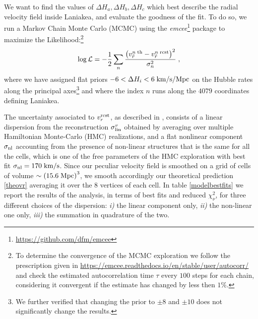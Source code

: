 \documentclass[notitlepage,nofootinbib]{revtex4-1}
\begin{document}
We want to find the values of $\Delta H_a,\Delta H_b,\Delta H_c$ which best describe the radial velocity field inside Laniakea, and evaluate the goodness of the fit. To do so, we run a Markov Chain Monte Carlo (MCMC) using the \textit{emcee}\footnote{\href{https://github.com/dfm/emcee}{https://github.com/dfm/emcee}} package \cite{2013PASP..125..306F} to maximize the Likelihood:\footnote{To determine the convergence of the MCMC exploration we follow the prescription given in \href{https://emcee.readthedocs.io/en/stable/user/autocorr/}{https://emcee.readthedocs.io/en/stable/user/autocorr/} and check the estimated autocorrelation time $\tau$ every $100$ steps for each chain, considering it convergent if the estimate has changed by less then $1\%$.}
\begin{equation}
\log{\mathcal{L}}=-\frac{1}{2}\sum_n\frac{\left(v^{n\;\rm{th}}_{\tilde{r}} -v^{n\;\rm{rcst}}_{\tilde{r}}\right)^2}{\sigma^2_n}\;,
\end{equation} 
where we have assigned flat priors $-6 < \Delta H_i < 6 \; \rm{km}/\rm{s}/\rm{Mpc}$  on the Hubble rates along the principal axes\footnote{We further verified that changing the prior to $\pm 8$ and $\pm 10$ does not significantly change the results.} and where the index $n$ runs along the $4079$ coordinates defining Laniakea.


The uncertainty associated to $v_r^{\rm{rcst}}$, as described in \cite{Dupuy:2023ffz}, consists of a linear dispersion from the reconstruction $\sigma^{v}_{\rm lin}$ obtained by averaging over multiple Hamiltonian Monte-Carlo (HMC) realizations, and a flat nonlinear component $\sigma_{\rm{nl}}$ accounting from the presence of non-linear structures that is the same for all the cells, which is one of the free parameters of the HMC exploration with best fit $\sigma_{\rm{nl}}=170\; \rm{km/s}$. Since our peculiar velocity field is smoothed on a grid of cells of volume $\sim \left(15.6 \;\rm{Mpc}\right)^3$, we smooth accordingly our theoretical prediction \eqref{theovr} averaging it over the 8 vertices of each cell. In table \ref{modelbestfits} we report the results of the analysis, in terms of best fits and reduced $\chi^2_\nu$, for three different choices of the dispersion: \textit{i)} the linear component only, \textit{ii)} the non-linear one only, \textit{iii)} the summation in quadrature of the two.    
\end{document}
